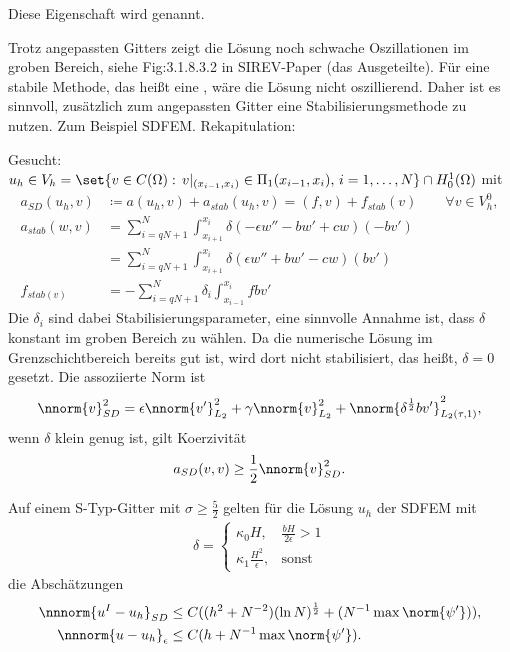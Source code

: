 \begin{bemerkung*}
  Diese Eigenschaft wird  genannt. 
\end{bemerkung*}
Trotz angepassten Gitters zeigt die Lösung noch schwache Oszillationen im groben Bereich, siehe Fig:3.1.8.3.2 in SIREV-Paper (das Ausgeteilte). Für eine stabile Methode, das heißt eine , wäre die Lösung nicht oszillierend. Daher ist es sinnvoll, zusätzlich zum angepassten Gitter eine Stabilisierungsmethode zu nutzen. Zum Beispiel SDFEM. Rekapitulation: 
\smallskip

Gesucht: $u_{h} \in V_{h}= \set{v \in C(\Omega): \, v|_{(x_{i-1}, x_{i})} \in \Pi_{1}(x_{i-1}, x_{i}), \, i = 1, \dots, N}\cap H_{0}^{1}(\Omega)$ mit
\begin{align*}
  a_{SD} (u_{h}, v) &\coloneqq a(u_{h}, v) +a_{stab}(u_{h}, v) = (f, v) + f_{stab}(v)  \qquad \forall v \in V_{h}^{0}, \\
  a_{stab}(w, v) &= \sum_{i = qN +1}^{N} \int_{x_{i+1}}^{x_{i}} \delta(- \epsilon w'' - b w' + cw)(-bv')\\
  &= \sum_{i = qN +1}^{N} \int_{x_{i+1}}^{x_{i}} \delta(\epsilon w'' + b w' - cw)(bv')\\
  f_{stab (v)} &= - \sum_{i = qN +1}^{N} \delta_{i} \int_{x_{i-1}}^{x_{i}} f b v'
\end{align*}
Die $\delta_{i}$ sind dabei Stabilisierungsparameter, eine sinnvolle Annahme ist, dass $\delta$ konstant im groben Bereich zu wählen. Da die numerische Lösung im Grenzschichtbereich bereits gut ist, wird dort nicht stabilisiert, das heißt, $\delta =0$ gesetzt. Die assoziierte Norm ist
\begin{align*}
  \nnorm {v}_{SD}^{2} = \epsilon   \nnorm {v'}_{L_{2}}^{2} + \gamma \nnorm {v}_{L_{2}}^{2}  + \nnorm { \delta^{\frac 12}bv'}_{L_{2}(\tau, 1)}^{2}, 
\end{align*}
wenn $\delta$ klein genug ist, gilt Koerzivität
\begin{align*}
  a_{SD} (v, v) \geq \frac 12 \nnorm {v}_{SD}^{2}. 
\end{align*}
\begin{satz}\label{thm:6-21}
  Auf einem S-Typ-Gitter mit $\sigma \geq \frac 52$ gelten für die Lösung $u_{h}$ der SDFEM mit
  \begin{align*}
    \delta =
    \begin{cases}
      \kappa_{0} H, & \frac{b H}{ 2 \epsilon}>1 \\
      \kappa_{1} \frac {H^{2}} \epsilon, & \text{sonst}
    \end{cases}
  \end{align*}
  die Abschätzungen
  \begin{align*}
    \nnnorm{u^{I} - u_{h}}_{SD} &\leq C ((h^{2} + N^{-2}) (\ln N)^{\frac 12} + (N^{-1} \max \norm{\psi'})), \\
    \nnnorm{u - u_{h}}_{\epsilon} &\leq C (h + N^{-1} \max\norm{\psi'}). 
  \end{align*}
\end{satz}
